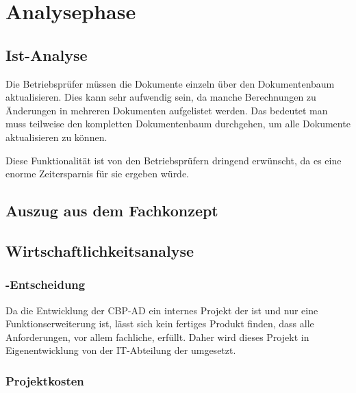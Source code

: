 
\clearpage
\section{Analysephase} 
\label{sec:Analysephase}


\subsection{Ist-Analyse} 
\label{sec:IstAnalyse}

Die Betriebsprüfer müssen die Dokumente einzeln über den Dokumentenbaum aktualisieren. Dies kann sehr aufwendig sein, da manche Berechnungen zu Änderungen in mehreren Dokumenten aufgelistet werden. Das bedeutet man muss teilweise den kompletten Dokumentenbaum durchgehen, um alle Dokumente aktualisieren zu können.


Diese Funktionalität ist von den Betriebsprüfern dringend erwünscht, da es eine enorme Zeitersparnis für sie ergeben würde.

\subsection{Auszug aus dem Fachkonzept}
\label{sec:AuszugFachkonzept}


\subsection{Wirtschaftlichkeitsanalyse}
\label{sec:Wirtschaftlichkeitsanalyse}

\subsubsection{-Entscheidung}
\label{sec:MakeOrBuyEntscheidung}

Da die Entwicklung der \acs{CBP-AD} ein internes Projekt der \DRV ist und nur eine Funktionserweiterung ist, lässt sich kein fertiges Produkt finden, dass alle Anforderungen, vor allem fachliche, erfüllt. Daher wird dieses Projekt in Eigenentwicklung von der IT-Abteilung der \DRV umgesetzt.

\subsubsection{Projektkosten}
\label{sec:Projektkosten}

